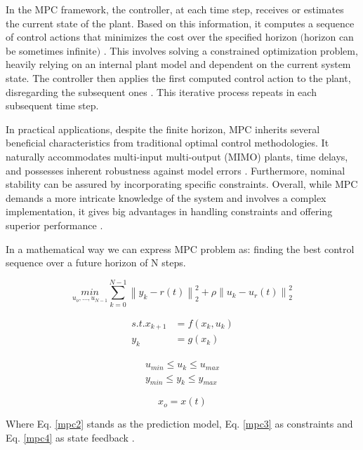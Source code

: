In the MPC framework, the controller, at each time step, receives or estimates the current state of the plant. Based on this information, it computes a sequence of control actions that minimizes the cost over the specified horizon $($horizon can be sometimes infinite$)$ \cite{matlabMPC}\cite{zaklPredRiad}. This involves solving a constrained optimization problem, heavily relying on an internal plant model and dependent on the current system state. The controller then applies the first computed control action to the plant, disregarding the subsequent ones \cite{matlabMPC}. This iterative process repeats in each subsequent time step.

In practical applications, despite the finite horizon, MPC inherits several beneficial characteristics from traditional optimal control methodologies. It naturally accommodates multi-input multi-output (MIMO) plants, time delays, and possesses inherent robustness against model errors \cite{mpcLecture}. Furthermore, nominal stability can be assured by incorporating specific constraints. Overall, while MPC demands a more intricate knowledge of the system and involves a complex implementation, it gives big advantages in handling constraints and offering superior performance \cite{zaklPredRiad}.

In a mathematical way we can express MPC problem as: finding the best control sequence over a future horizon of N steps.

\begin{equation}\label{mpc1}
\underset{u_o,...,u_{N-1}}{min}\sum_{k=0}^{N-1}\left \| y_k-r(t) \right \|_{2}^{2}+\rho \left \| u_k-u_r(t) \right \|_{2}^{2}
\end{equation}

\begin{align}\label{mpc2}
s.t.	x_{k+1}&=f(x_k,u_k)\\ 
	y_k &=g(x_k)
\end{align}

\begin{align}\label{mpc3}
	u_{min}\leq u_k\leq u_{max}\\
	y_{min}\leq y_k\leq y_{max}
\end{align}

\begin{equation}\label{mpc4}
	x_o=x(t)
\end{equation}

Where Eq. \ref{mpc2} stands as the prediction model, Eq. \ref{mpc3} as constraints and Eq. \ref{mpc4} as state feedback \cite{mpcLecture}. 

